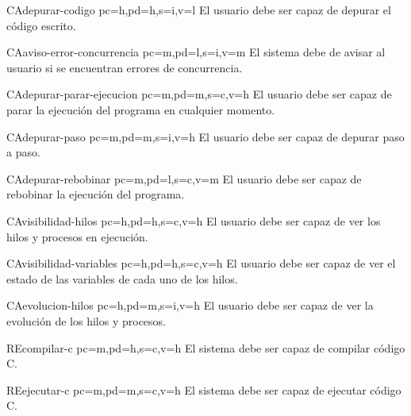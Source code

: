 \begin{userReq}{CA}{depurar-codigo}
    {pc=h,pd=h,s=i,v=l}
    El usuario debe ser capaz de depurar el código escrito.
\end{userReq}

\begin{userReq}{CA}{aviso-error-concurrencia}
    {pc=m,pd=l,s=i,v=m}
    El sistema debe de avisar al usuario si se encuentran errores de concurrencia.
\end{userReq}

\begin{userReq}{CA}{depurar-parar-ejecucion}
    {pc=m,pd=m,s=c,v=h}
    El usuario debe ser capaz de parar la ejecución del programa en cualquier momento.
\end{userReq}

\begin{userReq}{CA}{depurar-paso}
    {pc=m,pd=m,s=i,v=h}
    El usuario debe ser capaz de depurar paso a paso.
\end{userReq}

\begin{userReq}{CA}{depurar-rebobinar}
    {pc=m,pd=l,s=c,v=m}
    El usuario debe ser capaz de rebobinar la ejecución del programa.
\end{userReq}

\begin{userReq}{CA}{visibilidad-hilos}
    {pc=h,pd=h,s=c,v=h}
    El usuario debe ser capaz de ver los hilos y procesos en ejecución.
\end{userReq}

\begin{userReq}{CA}{visibilidad-variables}
    {pc=h,pd=h,s=c,v=h}
    El usuario debe ser capaz de ver el estado de las variables de cada uno de los hilos.
\end{userReq}

\begin{userReq}{CA}{evolucion-hilos}
    {pc=h,pd=m,s=i,v=h}
    El usuario debe ser capaz de ver la evolución de los hilos y procesos.
\end{userReq}

\begin{userReq}{RE}{compilar-c}
    {pc=m,pd=h,s=c,v=h}
    El sistema debe ser capaz de compilar código C.
\end{userReq}

\begin{userReq}{RE}{ejecutar-c}
    {pc=m,pd=m,s=c,v=h}
    El sistema debe ser capaz de ejecutar código C.
\end{userReq}

